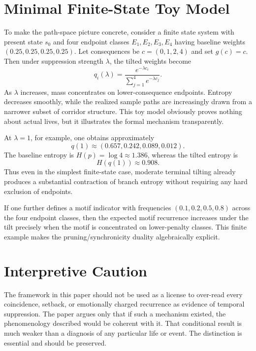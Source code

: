 \documentclass[12pt]{article}
\begin{document}
\appendix

\section{Minimal Finite-State Toy Model}

To make the path-space picture concrete, consider a finite state system with present state $s_0$ and four endpoint classes $E_1,E_2,E_3,E_4$ having baseline weights $(0.25,0.25,0.25,0.25)$. Let consequences be $c=(0,1,2,4)$ and set $g(c)=c$. Then under suppression strength $\lambda$, the tilted weights become
\[
q_i(\lambda) = \frac{e^{-\lambda c_i}}{\sum_{j=1}^4 e^{-\lambda c_j}}.
\]
As $\lambda$ increases, mass concentrates on lower-consequence endpoints. Entropy decreases smoothly, while the realized sample paths are increasingly drawn from a narrower subset of corridor structure. This toy model obviously proves nothing about actual lives, but it illustrates the formal mechanism transparently.

At $\lambda=1$, for example, one obtains approximately
\[
q(1) \approx (0.657, 0.242, 0.089, 0.012).
\]
The baseline entropy is $H(p)=\log 4 \approx 1.386$, whereas the tilted entropy is
\[
H(q(1)) \approx 0.908.
\]
Thus even in the simplest finite-state case, moderate terminal tilting already produces a substantial contraction of branch entropy without requiring any hard exclusion of endpoints.

If one further defines a motif indicator with frequencies $(0.1,0.2,0.5,0.8)$ across the four endpoint classes, then the expected motif recurrence increases under the tilt precisely when the motif is concentrated on lower-penalty classes. This finite example makes the pruning/synchronicity duality algebraically explicit.

\section{Interpretive Caution}

The framework in this paper should not be used as a license to over-read every coincidence, setback, or emotionally charged recurrence as evidence of temporal suppression. The paper argues only that if such a mechanism existed, the phenomenology described would be coherent with it. That conditional result is much weaker than a diagnosis of any particular life or event. The distinction is essential and should be preserved.
\end{document}
